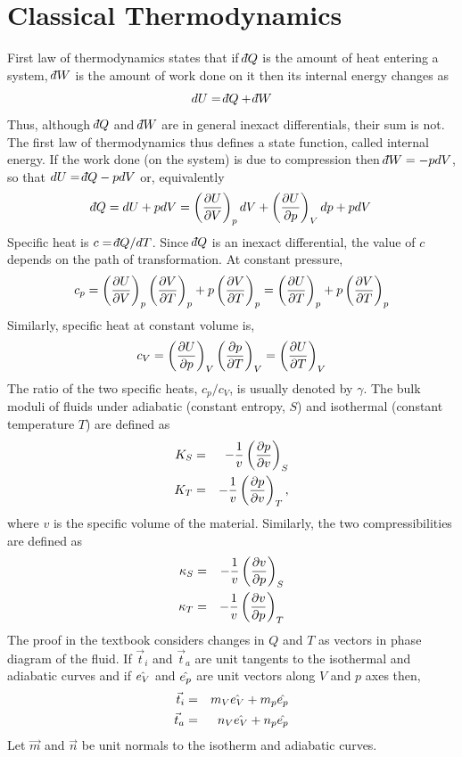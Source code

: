 \section{Classical Thermodynamics}\label{c1s5}
First law of thermodynamics states that if $\dbar Q$ is the amount of heat entering a system, $\dbar W$ is the amount of work done on it then its internal energy changes as
\[
dU = \dbar Q + \dbar W
\]
Thus, although $\dbar Q$ and $\dbar W$ are in general inexact differentials, their sum is not. The first law of thermodynamics thus defines a state function, called internal energy. If
the work done (on the system) is due to compression then $\dbar W = -pdV$, so that $dU = \dbar Q - pdV$ or, equivalently
\[
\dbar Q = dU + pdV = \left(\pdt{U}{V}\right)_pdV + \left(\pdt{U}{p}\right)_Vdp + pdV
\]
Specific heat is $c = \dbar Q/dT$. Since $\dbar Q$ is an inexact differential, the value of $c$ depends on the path of transformation. At constant pressure,
\[
c_p = \left(\frac{\partial{U}}{\partial{V}}\right)_p\left(\frac{\partial{V}}{\partial{T}}\right)_p + p\left(\frac{\partial{V}}{\partial{T}}\right)_p = \left(\frac{\partial{U}}{\partial{T}}\right)_p + p\left(\frac{\partial{V}}{\partial{T}}\right)_p
\]
Similarly, specific heat at constant volume is,
\[
c_V = \left(\frac{\partial{U}}{\partial{p}}\right)_V\left(\frac{\partial{p}}{\partial{T}}\right)_V = \left(\frac{\partial{U}}{\partial{T}}\right)_V
\]
The ratio of the two specific heats, $c_p/c_V$, is usually denoted by $\gamma$. The bulk moduli of fluids under adiabatic (constant entropy, $S$) and isothermal 
(constant temperature $T$) are defined as
\begin{eqnarray*}
K_S &=& -\frac{1}{v}\left(\frac{\partial{p}}{\partial{v}}\right)_S \\
K_T &=& -\frac{1}{v}\left(\frac{\partial{p}}{\partial{v}}\right)_T,
\end{eqnarray*}
where $v$ is the specific volume of the material. Similarly, the two compressibilities are defined as
\begin{eqnarray*}
\kappa_S &=& -\frac{1}{v}\left(\frac{\partial{v}}{\partial{p}}\right)_S \\
\kappa_T &=& -\frac{1}{v}\left(\frac{\partial{v}}{\partial{p}}\right)_T
\end{eqnarray*}
The proof in the textbook considers changes in $Q$ and $T$ as vectors in phase diagram of the fluid. If $\vec{t}_i$ and $\vec{t}_a$ are unit tangents to the isothermal and adiabatic 
curves and if $\hat{e_{V}}$ and $\hat{e_{p}}$ are unit vectors along $V$ and $p$ axes then,
\begin{eqnarray*}
\vec{t}_i &=& m_V\hat{e_{V}} + m_p\hat{e_{p}} \\
\vec{t}_a &=& n_V\hat{e_{V}} + n_p\hat{e_{p}}
\end{eqnarray*}
Let $\vec{m}$ and $\vec{n}$ be unit normals to the isotherm and adiabatic curves.
